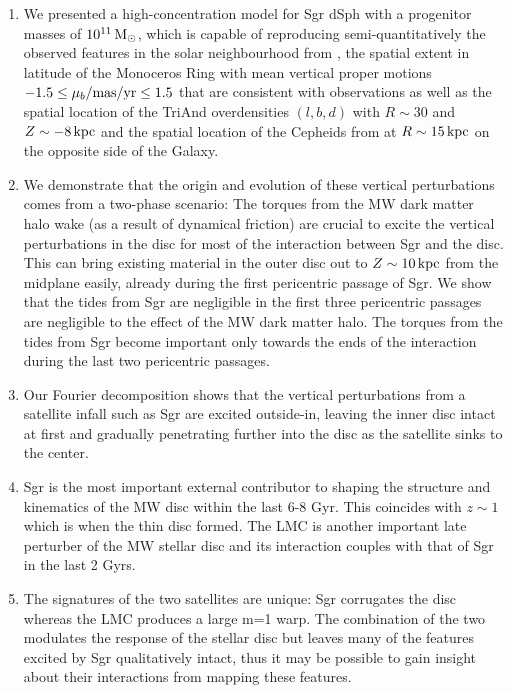 \documentclass[useAMS,usenatbib]{mnras}
\begin{document}
{\begin{enumerate}
\item We presented a high-concentration model for Sgr dSph with a progenitor masses of $10^{11} \,\rm{M_{\odot}}$, which is capable of reproducing semi-quantitatively the observed features in the solar neighbourhood from \citep{widrow12}, the spatial extent in latitude of the Monoceros Ring with mean vertical proper motions $-1.5 \leq\mu _{b}/\rm{mas/yr}\leq 1.5$ that are consistent with observations \citep{deboer17} as well as the spatial location of the TriAnd overdensities $(l,b,d)$ with $R\sim30$ and $Z\sim -8 \,\rm{kpc}$ and the spatial location of the Cepheids from \cite{feast14} at $R\sim15\,\rm{kpc}$ on the opposite side of the Galaxy.

\item We demonstrate that the origin and evolution of these vertical perturbations comes from a two-phase scenario: The torques from the MW dark matter halo wake (as a result of dynamical friction) are crucial to excite the vertical perturbations in the disc for most of the interaction between Sgr and the disc. This can bring existing material in the outer disc out to $Z\sim10\,\rm{kpc}$ from the midplane easily, already during the first pericentric passage of Sgr. We show that the tides from Sgr are negligible in the first three pericentric passages are negligible to the effect of the MW dark matter halo. The torques from the tides from Sgr become important only towards the ends of the interaction during the last two pericentric passages.
\item Our Fourier decomposition shows that the vertical perturbations from a satellite infall such as Sgr are excited outside-in, leaving the inner disc intact at first and gradually penetrating further into the disc as the satellite sinks to the center. 
\item Sgr is the most important external contributor to shaping the structure and kinematics of the MW disc within the last 6-8 Gyr. This coincides with $z\sim1$ which is when the thin disc formed. The LMC is another important late perturber of the MW stellar disc and its interaction couples with that of Sgr in the last 2 Gyrs.
\item The signatures of the two satellites are unique: Sgr corrugates the disc whereas the LMC produces a large m=1 warp. The combination of the two modulates the response of the stellar disc but leaves many of the features excited by Sgr qualitatively intact, thus it may be possible to gain insight about their interactions from mapping these features. 


\end{enumerate}}
\end{document}
